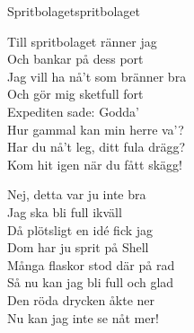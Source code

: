 \begin{song}{Spritbolaget}{spritbolaget}
\begin{vers}
Till spritbolaget ränner jag\\
Och bankar på dess port\\
Jag vill ha nå't som bränner bra\\
Och gör mig sketfull fort\\
Expediten sade: Godda'\\
Hur gammal kan min herre va'?\\
Har du nå't leg, ditt fula drägg?\\
Kom hit igen när du fått skägg!\\
\end{vers}
\begin{vers}
Nej, detta var ju inte bra\\
Jag ska bli full ikväll\\
Då plötsligt en idé fick jag\\
Dom har ju sprit på Shell\\
Många flaskor stod där på rad\\
Så nu kan jag bli full och glad\\
Den röda drycken åkte ner\\
Nu kan jag inte se nåt mer!\\
\end{vers}
\end{song}
